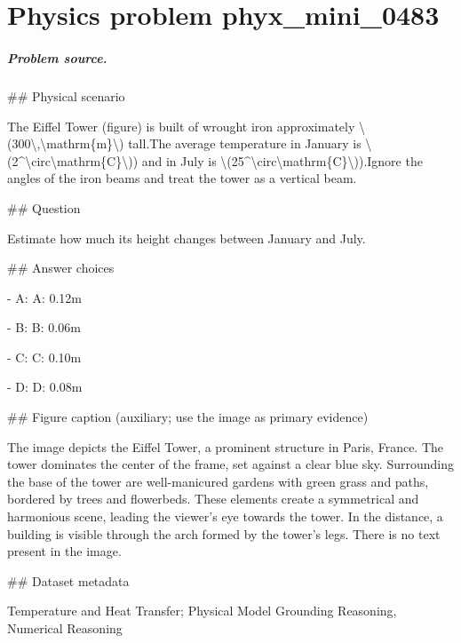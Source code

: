 
\chapter{Physics problem phyx\_mini\_0483}
\label{ch:PhyXMiniProblems_problem_phyx_mini_0483}

\paragraph{Problem source.}
\#\# Physical scenario

The Eiffel Tower (figure) is built of wrought iron approximately \textbackslash{}(300\textbackslash{},\textbackslash{}mathrm\{m\}\textbackslash{}) tall.The average temperature in January is \textbackslash{}(2\textasciicircum{}\textbackslash{}circ\textbackslash{}mathrm\{C\}\textbackslash{})) and in July is \textbackslash{}(25\textasciicircum{}\textbackslash{}circ\textbackslash{}mathrm\{C\}\textbackslash{})).Ignore the angles of the iron beams and treat the tower as a vertical beam.

\#\# Question

Estimate how much its height changes between January and July.

\#\# Answer choices

- A: A: 0.12m

- B: B: 0.06m

- C: C: 0.10m

- D: D: 0.08m

\#\# Figure caption (auxiliary; use the image as primary evidence)

The image depicts the Eiffel Tower, a prominent structure in Paris, France. The tower dominates the center of the frame, set against a clear blue sky. Surrounding the base of the tower are well-manicured gardens with green grass and paths, bordered by trees and flowerbeds. These elements create a symmetrical and harmonious scene, leading the viewer's eye towards the tower. In the distance, a building is visible through the arch formed by the tower's legs. There is no text present in the image.

\#\# Dataset metadata

Temperature and Heat Transfer; Physical Model Grounding Reasoning, Numerical Reasoning

